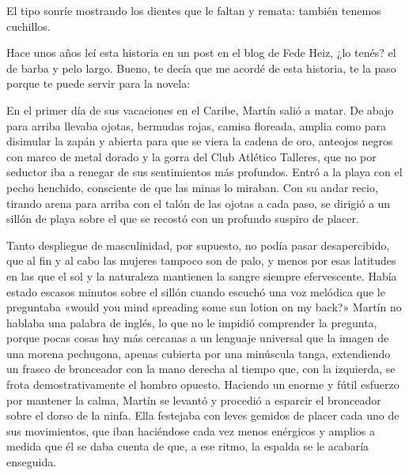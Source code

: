 \documentclass[12pt,twoside,openright,a5paper]{book}
\begin{document}
El tipo sonríe mostrando los dientes que le faltan y remata: también
tenemos cuchillos.

\vspace{0.5cm}

\hrulefill\hspace{0.2cm} \decofourleft\decofourright \hspace{0.2cm} \hrulefill
\vspace{0.5cm}

Hace unos años leí esta historia en un post en el blog de Fede Heiz,
¿lo tenés? el de barba y pelo largo. Bueno, te decía que me acordé de
esta historia, te la paso porque te puede servir para la novela:

En el primer día de sus vacaciones en el Caribe, Martín salió a matar. De
abajo para arriba llevaba ojotas, bermudas rojas, camisa floreada, amplia
como para disimular la zapán y abierta para que se viera la cadena de oro,
anteojos negros con marco de metal dorado y la gorra del Club Atlético
Talleres, que no por seductor iba a renegar de sus sentimientos más
profundos. Entró a la playa con el pecho henchido, consciente de que las
minas lo miraban. Con su andar recio, tirando arena para arriba con el
talón de las ojotas a cada paso, se dirigió a un sillón de playa sobre
el que se recostó con un profundo suspiro de placer.

Tanto despliegue de masculinidad, por supuesto, no podía pasar desapercibido,
que al fin y al cabo las mujeres tampoco son de palo, y menos por esas
latitudes en las que el sol y la naturaleza mantienen la sangre siempre
efervescente. Había estado escasos minutos sobre el sillón cuando escuchó
una voz melódica que le preguntaba «would you mind spreading some sun
lotion on my back?» Martín no hablaba una palabra de inglés, lo que no
le impidió comprender la pregunta, porque pocas cosas hay más cercanas a
un lenguaje universal que la imagen de una morena pechugona, apenas cubierta
por una minúscula tanga, extendiendo un frasco de bronceador con la mano
derecha al tiempo que, con la izquierda, se frota demostrativamente el
hombro opuesto. Haciendo un enorme y fútil esfuerzo por mantener la calma,
Martín se levantó y procedió a esparcir el bronceador sobre el dorso de la
ninfa. Ella festejaba con leves gemidos de placer cada uno de sus movimientos,
que iban haciéndose cada vez menos enérgicos y amplios a medida que él
se daba cuenta de que, a ese ritmo, la espalda se le acabaría enseguida.
\end{document}
